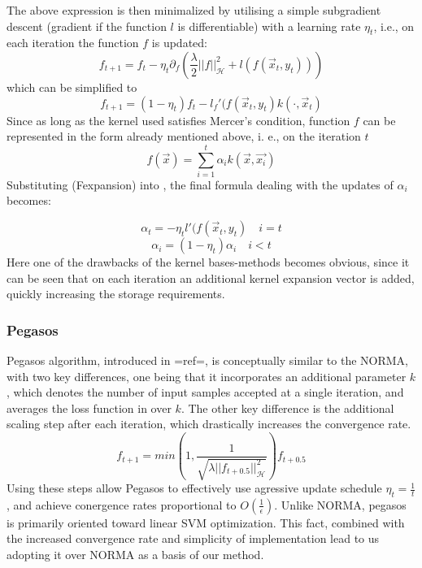 {The above expression is then minimalized by utilising a simple subgradient descent (gradient if the function $l$ is differentiable) with a learning rate $\eta_t$, i.e., on each iteration the function $f$ is updated:
\begin{equation*}
f_{t+1}=f_t-\eta_{t} \partial_f \left( \frac{\lambda}{2}||f||_\mathscr{H} ^2 +l(f(\vec{x}_t,y_t))\right) 
\end{equation*}
which can be simplified to
\begin{equation}
\label{NORMAUpdate}
f_{t+1}=(1-\eta_{t})f_t-l_f'(f(\vec{x}_t,y_t)k(\cdot,\vec{x}_t)
\end{equation}
Since as long as the kernel used satisfies Mercer's condition, function $f$ can be represented in the form already mentioned above, i. e., on the iteration $t$
\begin{equation}
\label{Fexpansion}
f(\vec{x})=\sum_{i=1}^{t}\alpha_i k(\vec{x},\vec{x_i})
\end{equation}
Substituting (Fexpansion) into  , the final formula dealing with the updates of $\alpha_i$ becomes:

$$
\alpha_t=-\eta_{t}l'(f(\vec{x}_t,y_t) \quad {i=t}
$$
$$
\alpha_i=(1-\eta_{t})\alpha_i \quad {i<t}
$$
Here one of the drawbacks of the kernel bases-methods becomes obvious, since it can be seen that on each iteration an additional kernel expansion vector is added, quickly increasing the storage requirements.

\subsubsection{Pegasos}
Pegasos algorithm, introduced in {{=ref=}}, is conceptually similar to the NORMA, with two key differences,
one being that it incorporates an additional parameter $k$, which denotes the number of input samples accepted at a single iteration, and averages the loss function in  over $k$. The other key difference is the additional scaling step after each iteration, which drastically increases the convergence rate.
$$
f_{t+1}=min(1,\frac{1}{\sqrt{\lambda ||f_{t+0.5}||_{\mathscr{H}}^2}})f_{t+0.5}
$$
Using these steps allow Pegasos to effectively use agressive update schedule $\eta_t=\frac{1}{t}$, and achieve conergence rates proportional to $O(\frac{1}{\epsilon})$. 
Unlike NORMA, pegasos is primarily oriented toward linear SVM optimization. This fact, combined with the increased convergence rate and simplicity of implementation lead to us adopting it over NORMA as a basis of our method. 

}
